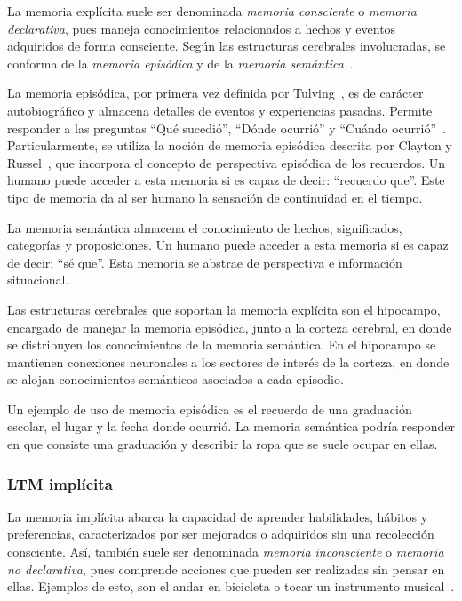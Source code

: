 La memoria explícita suele ser denominada \textit{memoria consciente} o \textit{memoria declarativa}, pues maneja conocimientos relacionados a hechos y eventos adquiridos de forma consciente. Según las estructuras cerebrales involucradas, se conforma de la \textit{memoria episódica} y de la \textit{memoria semántica}~\cite{Eichenbaum:2008}.

La memoria episódica, por primera vez definida por Tulving~\cite{2_tulving}, es de carácter  autobiográfico y almacena detalles de eventos y experiencias pasadas. Permite responder a las preguntas ``Qué sucedió'', ``Dónde ocurrió'' y ``Cuándo ocurrió''~\cite{Deutsch2008}. Particularmente, se utiliza la noción de memoria episódica descrita por Clayton y Russel~\cite{CLAYTON20092330}, que incorpora el concepto de perspectiva episódica de los recuerdos. Un humano puede acceder a esta memoria si es capaz de decir: ``recuerdo que''. Este tipo de memoria da al ser humano la sensación de continuidad en el tiempo.

La memoria semántica almacena el conocimiento de hechos, significados, categorías y proposiciones. Un humano puede acceder a esta memoria si es capaz de decir: ``sé que''. Esta memoria se abstrae de perspectiva e información situacional.

Las estructuras cerebrales que soportan la memoria explícita son el hipocampo, encargado de manejar la memoria episódica, junto a la corteza cerebral, en donde se distribuyen los conocimientos de la memoria semántica. En el hipocampo se mantienen conexiones neuronales a los sectores de interés de la corteza, en donde se alojan conocimientos semánticos asociados a cada episodio.

Un ejemplo de uso de memoria episódica es el recuerdo de una graduación escolar, el lugar y la fecha donde ocurrió. La memoria semántica podría responder en que consiste una graduación y describir la ropa que se suele ocupar en ellas.



\subsubsection{LTM implícita}

La memoria implícita abarca la capacidad de aprender habilidades, hábitos y preferencias, caracterizados por ser mejorados o adquiridos sin una recolección consciente. Así, también suele ser denominada \textit{memoria inconsciente} o \textit{memoria no declarativa}, pues comprende acciones que pueden ser realizadas sin pensar en ellas. Ejemplos de esto, son el andar en bicicleta o tocar un instrumento musical~\cite{Eichenbaum:2008}.

